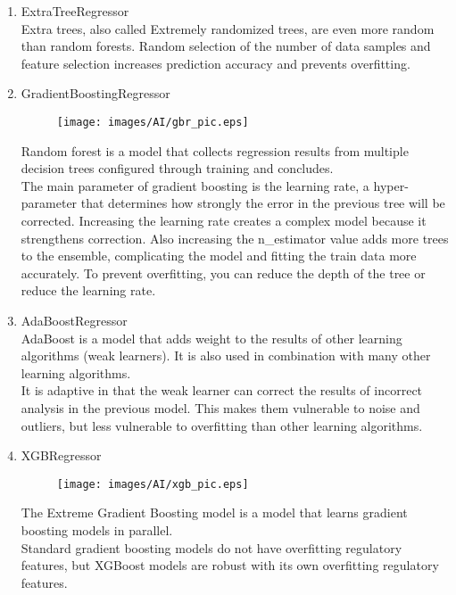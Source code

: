 \documentclass[11pt, conference]{IEEEtran}
\begin{document}
\begin{enumerate}[label=\arabic*]
\begin{enumerate}[label=\alph*]
\begin{enumerate}
            \item ExtraTreeRegressor\\
            Extra trees, also called Extremely randomized trees, are even more random than random forests. Random selection of the number of data samples and feature selection increases prediction accuracy and prevents overfitting.
            \item GradientBoostingRegressor\\
            \begin{figure}[H]
                \centering
                \texttt{[image: images/AI/gbr\_pic.eps]}
            \end{figure}
            Random forest is a model that collects regression results from multiple decision trees configured through training and concludes.\\
            The main parameter of gradient boosting is the learning rate, a hyper-parameter that determines how strongly the error in the previous tree will be corrected. Increasing the learning rate creates a complex model because it strengthens correction. Also increasing the n\_estimator value adds more trees to the ensemble, complicating the model and fitting the train data more accurately. To prevent overfitting, you can reduce the depth of the tree or reduce the learning rate.
            \item AdaBoostRegressor\\
            AdaBoost is a model that adds weight to the results of other learning algorithms (weak learners). It is also used in combination with many other learning algorithms.\\
            It is adaptive in that the weak learner can correct the results of incorrect analysis in the previous model. This makes them vulnerable to noise and outliers, but less vulnerable to overfitting than other learning algorithms.
            \item XGBRegressor\\
            \begin{figure}[H]
                \centering
                \texttt{[image: images/AI/xgb\_pic.eps]}
            \end{figure}
            The Extreme Gradient Boosting model is a model that learns gradient boosting models in parallel.\\
            Standard gradient boosting models do not have overfitting regulatory features, but XGBoost models are robust with its own overfitting regulatory features.

\end{enumerate}
\end{enumerate}
\end{enumerate}
\end{document}
